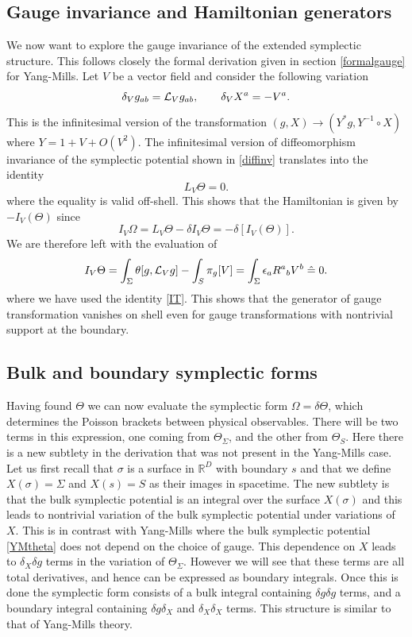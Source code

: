 \documentclass[a4paper,11pt]{article}
\newcommand{\be}{\begin{equation}}
\newcommand{\ee}{\end{equation}}
\newcommand{\hateq}{\mathrel{\hat{=}}}
\begin{document}
\subsection{Gauge invariance and Hamiltonian generators}
\label{subsection:gravity-puregauge}

We now want to explore the gauge invariance of the extended symplectic structure. 
This follows closely the formal derivation given in section \ref{formalgauge} for Yang-Mills.
Let $V$ be a vector field and consider the following variation
\be
\delta_V g_{ab} = {\cal{L}}_V g_{ab},\qquad 
\delta_V X^a =  - V^a.
\ee
This is the infinitesimal version of the transformation $(g,X)\to (Y^*g,Y^{-1}\circ X ) $ where $ Y = 1 + V + O(V^2)$. 
The infinitesimal version of diffeomorphism invariance of the symplectic potential shown in \eqref{diffinv} translates into the identity 
\be
L_V \Theta =0.
\ee 
where the equality is valid  off-shell.
This shows that the Hamiltonian is given by $-I_V(\Theta)$ since 
\be
I_V \Omega = L_V \Theta - \delta I_V \Theta = -\delta [I_V(\Theta)].
\ee
We are therefore left with the evaluation of
\be
I_V\Theta = \int_\Sigma \theta[g, {\cal L}_V g] - \int_S \pi_g[V]
= \int_\Sigma \epsilon_a R^a{}_b  V^b \hateq 0.
\ee
where we have used the identity \eqref{IT}. 
This shows that the generator of gauge transformation vanishes on shell even for gauge transformations with nontrivial support at the boundary.

\subsection{Bulk and boundary symplectic forms}

Having found $\Theta$ we can now evaluate the symplectic form $\Omega = \delta \Theta$, which determines the Poisson brackets between physical observables.
There will be two terms in this expression, one coming from $\Theta_\Sigma$, and the other from $\Theta_S$.
Here there is a new subtlety in the derivation that was not present in the Yang-Mills case.
Let us first recall that $\sigma$ is a surface in $\mathbb{R}^D$ with boundary $s$ and that we define $X(\sigma) = \Sigma$ and $X(s) = S$ as their images in spacetime.
The new subtlety is that the bulk symplectic potential is an integral over the surface $X(\sigma)$ and this leads to nontrivial variation of the bulk symplectic potential under variations of $X$.
This is in contrast with Yang-Mills where the bulk symplectic potential \eqref{YMtheta} does not depend on the choice of gauge.
This dependence on $X$ leads to $\delta_X \delta g$ terms in the variation of $\Theta_\Sigma$.
However we will see that these terms are all total derivatives, and hence can be expressed as boundary integrals.
Once this is done the symplectic form consists of a bulk integral containing $\delta g \delta g$ terms, and a boundary integral containing $\delta g \delta_X$ and $\delta_X \delta_X$ terms.
This structure is similar to that of Yang-Mills theory.
\end{document}
